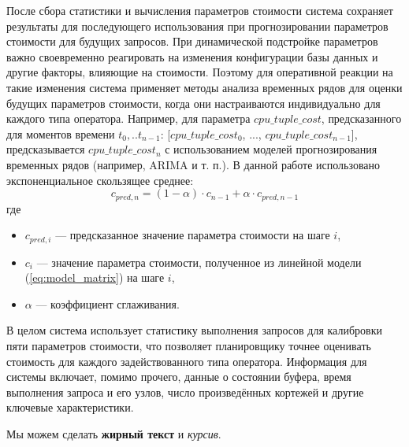 После сбора статистики и вычисления параметров стоимости система сохраняет
результаты для последующего использования при прогнозировании параметров стоимости
для будущих запросов. При динамической подстройке параметров важно своевременно
реагировать на изменения конфигурации базы данных и другие факторы, влияющие на
стоимости. Поэтому для оперативной реакции на такие изменения система применяет
методы анализа временных рядов для оценки будущих параметров стоимости, когда они
настраиваются индивидуально для каждого типа оператора.
Например, для параметра \(cpu\_tuple\_cost\), предсказанного для моментов времени
\(t_0,..t_{n-1}\): [\(cpu\_tuple\_cost_0\), ..., \(cpu\_tuple\_cost_{n-1}\)],
предсказывается \(cpu\_tuple\_cost_n\) с использованием моделей прогнозирования
временных рядов (например, ARIMA и т. п.). В данной работе использовано
экспоненциальное скользящее среднее:
\begin{equation}
    c_{pred, n} = (1 - \alpha) \cdot c_{n-1} + \alpha \cdot c_{pred, n - 1}
\end{equation}
где
\begin{itemize}
    \item \(c_{pred, i}\) — предсказанное значение параметра стоимости на шаге \(i\),
    \item \(c_i\) — значение параметра стоимости, полученное из линейной модели
    (\ref{eq:model_matrix}) на шаге \(i\),
    \item \(\alpha\) — коэффициент сглаживания.
\end{itemize}

В целом система использует статистику выполнения запросов для калибровки пяти
параметров стоимости, что позволяет планировщику точнее оценивать стоимость для
каждого задействованного типа оператора. Информация для системы включает,
помимо прочего, данные о состоянии буфера, время выполнения запроса и его узлов,
число произведённых кортежей и другие ключевые характеристики.



Мы можем сделать \textbf{жирный текст} и \textit{курсив}.


